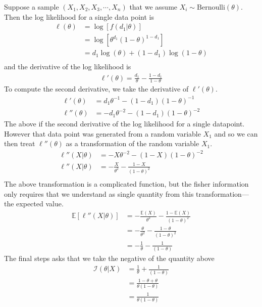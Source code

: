 \ex Suppose a sample $(X_{1},X_{2},X_{3},\cdots,X_{n})$ that we assume $X_{i} \sim \text{Bernoulli}(\theta)$. Then the log likelihood for a single data point is 
\begin{align}
    \ell(\theta) &= \log \left[ f(d_{1} | \theta) \right] \\ 
                &= \log \left[ \theta^{d_{1}}(1-\theta)^{1-d_{1}} \right] \\ 
                &=  d_{1}\log(\theta) + (1-d_{1})\log(1-\theta)  \\ 
\end{align}
and the derivative of the log likelihood is
\begin{align}
    \ell'(\theta) = \frac{d_{1}}{\theta} - \frac{1-d_{1}}{1-\theta} 
\end{align}
To compute the second derivative, we take the derivative of $\ell'(\theta)$. 
\begin{align}
    \ell'(\theta)   &= d_{1} \theta^{-1} - (1-d_{1})(1-\theta)^{-1} \\ 
    \ell''(\theta)  &= -d_{1} \theta^{-2} - (1-d_{1})(1-\theta)^{-2}
\end{align}
The above if the second derivative of the log likelihood for a single datapoint. 
However that data point was generated from a random variable $X_{1}$ and so we can then treat $ \ell''(\theta)$ as a transformation of the random variable $X_{1}$. 
\begin{align}
    \ell''(X | \theta)  &= -X \theta^{-2} - (1-X)(1-\theta)^{-2} \\ 
    \ell''(X | \theta)  &= - \frac{X}{\theta^{2}} - \frac{1-X}{ (1-\theta)^{2}} \\
\end{align}
The above transformation is a complicated function, but the fisher information only requires that we understand as single quantity from this transformation---the expected value. 
\begin{align}
    \mathbb{E}\left[\ell''(X | \theta)\right] &= - \frac{ \mathbb{E}(X)}{\theta^{2}} - \frac{1-\mathbb{E}(X)}{ (1-\theta)^{2}} \\ 
                                              &= -\frac{\theta}{\theta^{2}} - \frac{1-\theta}{ (1-\theta)^{2}} \\ 
                                              &= -\frac{1}{\theta} - \frac{1}{(1-\theta)}
\end{align}
The final steps asks that we take the negative of the quantity above 
\begin{align}
    \mathcal{I}(\theta | X) &=  \frac{1}{\theta} + \frac{1}{(1-\theta)} \\ 
                            &= \frac{ 1- \theta + \theta }{\theta(1-\theta)} \\ 
                            &= \frac{1}{\theta(1-\theta)}
\end{align}

